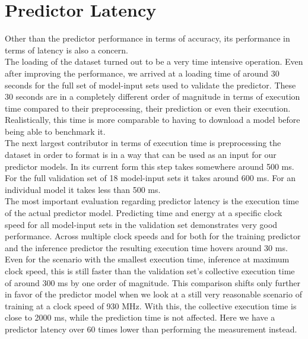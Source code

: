 \FloatBarrier



\section{Predictor Latency}

Other than the predictor performance in terms of accuracy, its performance in terms of latency is also a concern. \\
The loading of the dataset turned out to be a very time intensive operation. Even after improving the performance, we arrived at a loading time of around 30 seconds for the full set of model-input sets used to validate the predictor. These 30 seconds are in a completely different order of magnitude in terms of execution time compared to their preprocessing, their prediction or even their execution. Realistically, this time is more comparable to having to download a model before being able to benchmark it. \\
The next largest contributor in terms of execution time is preprocessing the dataset in order to format is in a way that can be used as an input for our predictor models. In its current form this step takes somewhere around 500 ms. For the full validation set of 18 model-input sets it takes around 600 ms. For an individual model it takes less than 500 ms. \\
The most important evaluation regarding predictor latency is the execution time of the actual predictor model. Predicting time and energy at a specific clock speed for all model-input sets in the validation set demonstrates very good performance. Across multiple clock speeds and for both for the training predictor and the inference predictor the resulting execution time hovers around 30 ms. Even for the scenario with the smallest execution time, inference at maximum clock speed, this is still faster than the validation set's collective execution time of around 300 ms by one order of magnitude. This comparison shifts only further in favor of the predictor model when we look at a still very reasonable scenario of training at a clock speed of 930 MHz. With this, the collective execution time is close to 2000 ms, while the prediction time is not affected. Here we have a predictor latency over 60 times lower than performing the measurement instead.